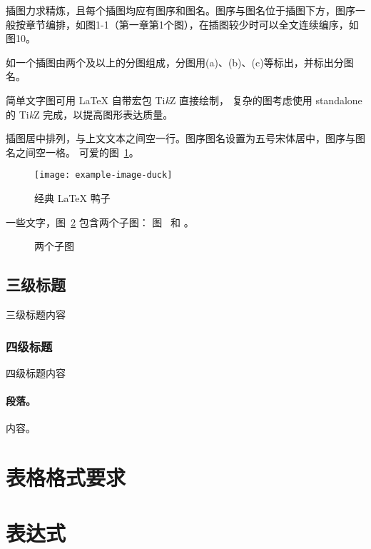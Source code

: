 \documentclass[fontset = mac ms]{seuthesis2024b}
\begin{document}
      插图力求精炼，且每个插图均应有图序和图名。图序与图名位于插图下方，图序一般按章节编排，如图1-1（第一章第1个图），在插图较少时可以全文连续编序，如图10。
      
      如一个插图由两个及以上的分图组成，分图用(a)、(b)、(c)等标出，并标出分图名。

      简单文字图可用 \LaTeX{} 自带宏包 Ti\textit{k}Z 直接绘制，
      复杂的图考虑使用 standalone 的 Ti\textit{k}Z 完成，以提高图形表达质量。

      插图居中排列，与上文文本之间空一行。图序图名设置为五号宋体居中，图序与图名之间空一格。
      可爱的图~\ref{fig:duck}。

      \begin{figure}[htbp]
        \centering
        \texttt{[image: example-image-duck]}
        \caption{经典 \LaTeX{} 鸭子}
        \label{fig:duck}
      \end{figure}

      一些文字，图~\ref{fig:subfigs} 包含两个子图：
      图~ 和 。

      \begin{figure}[htbp]
        \hfill
        \caption{两个子图}
        \label{fig:subfigs}
      \end{figure}

      \subsection{三级标题}
        三级标题内容
        \subsubsection{四级标题}
        四级标题内容
        \paragraph{段落。}内容。

    \section{表格格式要求}

    \section{表达式}
\end{document}
